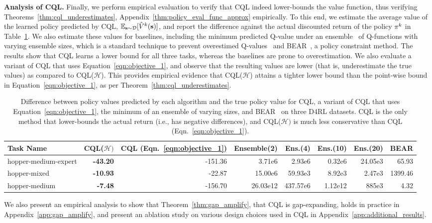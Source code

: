 \textbf{Analysis of CQL.} Finally, we perform empirical evaluation to verify that CQL indeed lower-bounds the value function, thus verifying Theorems~\ref{thm:cql_underestimates}, Appendix~\ref{thm:policy_eval_func_approx} empirically. To this end, we estimate the average value of the learned policy predicted by CQL, $\mathbb{E}_{\mathbf{s} \sim \mathcal{D}}[\hat{V}^k(\mathbf{s})]$, and report the difference against the actual discounted return of the policy $\pi^{k}$ in Table~\ref{table:cql_lower_bound}. We also estimate these values for baselines, including the minimum predicted Q-value under an ensemble~\citep{haarnoja,fujimoto2018addressing}
of Q-functions with varying ensemble sizes, which is a standard technique to prevent overestimed Q-values~\citep{fujimoto2018addressing,haarnoja,hasselt2010double} and BEAR~\citep{kumar2019stabilizing}, a policy constraint method. The results show that CQL learns a lower bound for all three tasks, whereas the baselines are prone to overestimation. We also evaluate a variant of CQL that uses Equation~\ref{eqn:objective_1}, and observe that the resulting values are lower (that is, underestimate the true values) as compared to CQL($\mathcal{H}$). This provides empirical evidence that CQL($\mathcal{H}$) attains a tighter lower bound than the point-wise bound in Equation~\ref{eqn:objective_1}, as per Theorem~\ref{thm:cql_underestimates}.

\begin{table}[h]
\captionsetup{font=small}
\centering
\vspace{-5pt}
    \fontsize{8}{8}\selectfont
    \begin{tabular}{l|r|r||r|r|r|r|r}
    \hline
        \textbf{Task Name} & \textbf{CQL($\mathcal{H})$} & \textbf{CQL (Eqn.~\ref{eqn:objective_1})} & \textbf{Ensemble(2)}  & \textbf{Ens.(4)} & \textbf{Ens.(10)} & \textbf{Ens.(20)} & \textbf{BEAR} \\
        \hline
        hopper-medium-expert & \textbf{-43.20} & -151.36 & 3.71e6 & 2.93e6 & 0.32e6 & 24.05e3 & 65.93 \\
        hopper-mixed & \textbf{-10.93} & -22.87 & 15.00e6 &  59.93e3 & 8.92e3 & 2.47e3 & 1399.46 \\
        hopper-medium & \textbf{-7.48} & -156.70 & 26.03e12 & 437.57e6 & 1.12e12 & 885e3 & 4.32 \\
        \hline
    \end{tabular}
    \caption{{Difference between policy values predicted by each algorithm and the true policy value for CQL, a variant of CQL that uses Equation~\ref{eqn:objective_1}, the minimum of an ensemble of varying sizes, and BEAR~\citep{kumar2019stabilizing} on three D4RL datasets. CQL is the only method that lower-bounds the actual return (i.e., has negative differences), and CQL($\mathcal{H})$ is much less conservative than CQL (Eqn.~\ref{eqn:objective_1}).}}
    \normalsize
    \vspace{-10pt}
    \label{table:cql_lower_bound}
\end{table}

We also present an empirical analysis to show that Theorem~\ref{thm:gap_amplify}, that CQL is gap-expanding, holds in practice in Appendix~\ref{app:gap_amplify}, and present an ablation study on various design choices used in CQL in Appendix~\ref{app:additional_results}.



